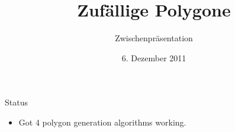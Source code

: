 \documentclass[ucs,11pt]{beamer}
\title[Zufällige Polygone]{Zufällige Polygone}
\subtitle{Zwischenpräsentation}
\institute[FU Berlin]{Freie Universität Berlin}
\date[06.12.2011]{6. Dezember 2011}
\begin{document}
\begin{frame}[plain]
	\titlepage
\end{frame}

\begin{frame}{Status}
	\begin{itemize}
	\item Got 4 polygon generation algorithms working.
	\end{itemize}
\end{frame}
\end{document}
